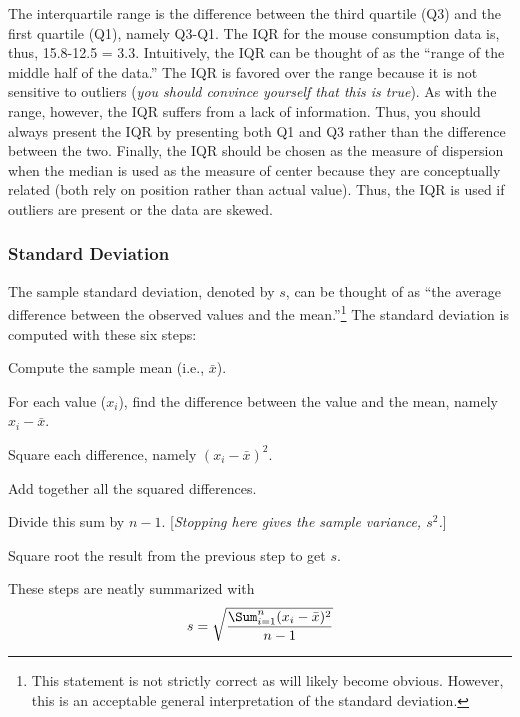 \documentclass[10pt,openany]{book}\usepackage[]{graphicx}\usepackage[]{color}
\begin{document}

The interquartile range is the difference between the third quartile (Q3) and the first quartile (Q1), namely Q3-Q1.  The IQR for the mouse consumption data is, thus, 15.8-12.5 = 3.3.  Intuitively, the IQR can be thought of as the ``range of the middle half of the data.''  The IQR is favored over the range because it is not sensitive to outliers (\textit{you should convince yourself that this is true}).  As with the range, however, the IQR suffers from a lack of information.  Thus, you should always present the IQR by presenting both Q1 and Q3 rather than the difference between the two.  Finally, the IQR should be chosen as the measure of dispersion when the median is used as the measure of center because they are conceptually related (both rely on position rather than actual value).  Thus, the IQR is used if outliers are present or the data are skewed.


\vspace{-12pt}

\subsubsection{Standard Deviation}\label{sect:StdDev}
The sample standard deviation, denoted by $s$, can be thought of as ``the average difference between the observed values and the mean.''\footnote{This statement is not strictly correct as will likely become obvious.  However, this is an acceptable general interpretation of the standard deviation.}  The standard deviation is computed with these six steps:
\begin{Enumerate}
  \item Compute the sample mean (i.e., $\bar{x}$).
  \item For each value ($x_{i}$), find the difference between the value and the mean, namely $x_{i}-\bar{x}$.
  \item Square each difference, namely $(x_{i}-\bar{x})^{2}$.
  \item Add together all the squared differences.
  \item Divide this sum by $n-1$.  [\textit{Stopping here gives the sample variance, $s^{2}$.}]
  \item Square root the result from the previous step to get $s$.
\end{Enumerate}
These steps are neatly summarized with
\begin{equation}
  \label{eqn:SampleSD}
     s = \sqrt{\frac{\Sum_{i=1}^{n}(x_{i}-\bar{x})^{2}}{n-1}}
\end{equation}
\end{document}
